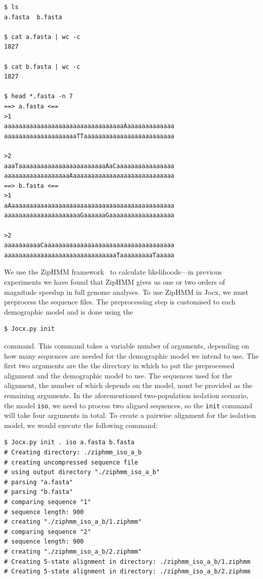 \documentclass[graybox]{svmult}
\begin{document}
 {\scriptsize{}\begin{verbatim}
$ ls
a.fasta  b.fasta

$ cat a.fasta | wc -c
1827

$ cat b.fasta | wc -c
1827

$ head *.fasta -n 7
==> a.fasta <==
>1
aaaaaaaaaaaaaaaaaaaaaaaaaaaaaaaaaAaaaaaaaaaaaaa
aaaaaaaaaaaaaaaaaaaaTTaaaaaaaaaaaaaaaaaaaaaaaaa

>2
aaaTaaaaaaaaaaaaaaaaaaaaaaaaAaCaaaaaaaaaaaaaaaa
aaaaaaaaaaaaaaaaaaAaaaaaaaaaaaaaaaaaaaaaaaaaaaa
==> b.fasta <==
>1
aAaaaaaaaaaaaaaaaaaaaaaaaaaaaaaaaaaaaaaaaaaaaaa
aaaaaaaaaaaaaaaaaaaaaGaaaaaaGaaaaaaaaaaaaaaaaaa

>2
aaaaaaaaaaCaaaaaaaaaaaaaaaaaaaaaaaaaaaaaaaaaaaa
aaaaaaaaaaaaaaaaaaaaaaaaaaaaaaaTaaaaaaaaaTaaaaa
\end{verbatim}}


We use the ZipHMM framework~\cite{Sand:2013bia} to calculate likelihoods---in previous experiments we have found that ZipHMM gives us one or two orders of magnitude speedup in full genome analyses. To use ZipHMM in Jocx, we must preprocess the sequence files. The preprocessing step is customised to each demographic model and is done using the
 {\scriptsize{}\begin{verbatim}
$ Jocx.py init
\end{verbatim}}
\noindent
command. This command takes a variable number of arguments, depending on how many sequences are needed for the demographic model we intend to use. The first two arguments are the the directory in which to put the preprocessed alignment and the demographic model to use. The sequences used for the alignment, the number of which depends on the model, must be provided as the remaining arguments. In the aforementioned two-population isolation scenario, the model \texttt{iso}, we need to process two aligned sequences, so the \texttt{init} command will take four arguments in total. To create a pairwise alignment for the isolation model, we would execute the following command:

 {\scriptsize{}\begin{verbatim}
$ Jocx.py init . iso a.fasta b.fasta
# Creating directory: ./ziphmm_iso_a_b
# creating uncompressed sequence file
# using output directory "./ziphmm_iso_a_b"
# parsing "a.fasta"
# parsing "b.fasta"
# comparing sequence "1"
# sequence length: 900
# creating "./ziphmm_iso_a_b/1.ziphmm"
# comparing sequence "2"
# sequence length: 900
# creating "./ziphmm_iso_a_b/2.ziphmm"
# Creating 5-state alignment in directory: ./ziphmm_iso_a_b/1.ziphmm
# Creating 5-state alignment in directory: ./ziphmm_iso_a_b/2.ziphmm
\end{verbatim}}
\end{document}
